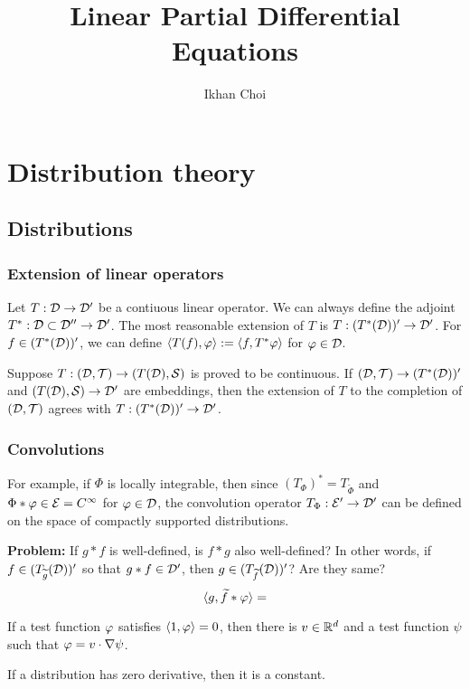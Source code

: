 \documentclass{../note}
\begin{document}
\title{Linear Partial Differential Equations}
\author{Ikhan Choi}
\maketitle
\tableofcontents


\part{Distribution theory}
\chapter{Distributions}


\section{Extension of linear operators}
Let $T:\mathcal{D}\to\mathcal{D}'$ be a contiuous linear operator.
We can always define the adjoint $T^*:\mathcal{D}\subset\mathcal{D}''\to\mathcal{D}'$.
The most reasonable extension of $T$ is $T:(T^*(\mathcal{D}))'\to\mathcal{D}'$.
For $f\in(T^*(\mathcal{D}))'$, we can define $\langle T(f),\varphi\rangle:=\langle f,T^*\varphi\rangle$ for $\varphi\in\mathcal{D}$.

Suppose $T:(\mathcal{D},\mathcal{T})\to(T(\mathcal{D}),\mathcal{S})$ is proved to be continuous.
If $(\mathcal{D},\mathcal{T})\to(T^*(\mathcal{D}))'$ and $(T(\mathcal{D}),\mathcal{S})\to\mathcal{D}'$ are embeddings, then the extension of $T$ to the completion of $(\mathcal{D},\mathcal{T})$ agrees with $T:(T^*(\mathcal{D}))'\to\mathcal{D}'$.

\section{Convolutions}
For example, if $\Phi$ is locally integrable, then since $(T_\Phi)^*=T_{\tilde\Phi}$ and $\Phi*\varphi\in\mathcal{E}=C^\infty$ for $\varphi\in\mathcal{D}$, the convolution operator $T_\Phi:\mathcal{E}'\to\mathcal{D}'$ can be defined on the space of compactly supported distributions.

\textbf{Problem:}
If $g*f$ is well-defined, is $f*g$ also well-defined?
In other words, if $f\in(T_{\widetilde g}(\mathcal{D}))'$ so that $g*f\in\mathcal{D}'$, then $g\in(T_{\widetilde f}(\mathcal{D}))'$? Are they same?
\[\langle g,\widetilde f*\varphi\rangle=\]


\begin{prb}
\begin{parts}
\item If a test function $\varphi$ satisfies $\langle1,\varphi\rangle=0$, then there is $v\in\mathbb{R}^d$ and a test function $\psi$ such that $\varphi=v\cdot\nabla\psi$.
\item If a distribution has zero derivative, then it is a constant.
\end{parts}
\end{prb}
\end{document}
